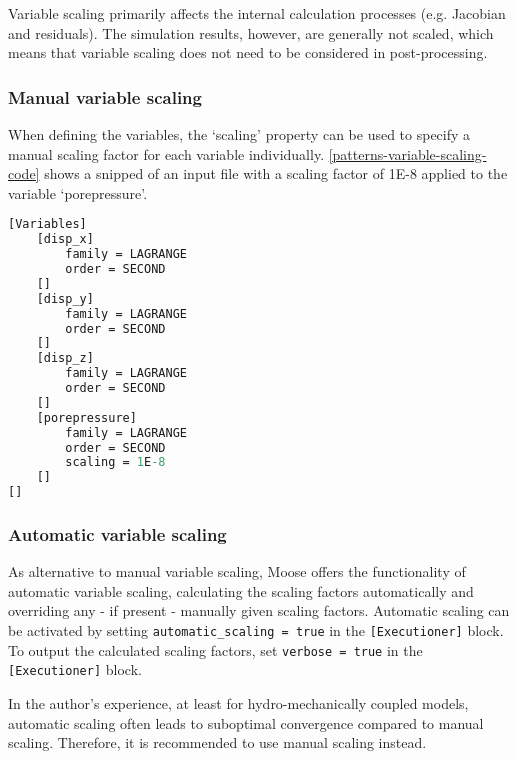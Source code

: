 Variable scaling primarily affects the internal calculation processes (e.g.
Jacobian and residuals). The simulation results, however, are generally not
scaled, which means that variable scaling does not need to be considered in
post-processing.

\subsubsection{Manual variable scaling}

When defining the variables, the ‘scaling’ property can be used to specify a
manual scaling factor for each variable individually.
\autoref{patterns-variable-scaling-code} shows a snipped of an input file with
a scaling factor of \qty{1E-8}{} applied to the variable ‘porepressure’.

\begin{lstlisting}[language=perl, caption={Variable definition with scaling on porepressure in a Moose inut file},label={patterns-variable-scaling-code}]
[Variables]
    [disp_x]
        family = LAGRANGE
        order = SECOND
    []
    [disp_y]
        family = LAGRANGE
        order = SECOND
    []
    [disp_z]
        family = LAGRANGE
        order = SECOND
    []
    [porepressure]
        family = LAGRANGE
        order = SECOND
        scaling = 1E-8
    []
[]
\end{lstlisting}

\subsubsection{Automatic variable scaling}

As alternative to manual variable scaling, Moose offers the functionality of
automatic variable scaling, calculating the scaling factors automatically and
overriding any - if present - manually given scaling factors. Automatic scaling
can be activated by setting \texttt{automatic\_scaling = true} in the
\texttt{[Executioner]} block. To output the calculated scaling factors, set
\texttt{verbose = true} in the \texttt{[Executioner]} block.

In the author's experience, at least for hydro-mechanically coupled models,
automatic scaling often leads to suboptimal convergence compared to manual
scaling. Therefore, it is recommended to use manual scaling instead.



